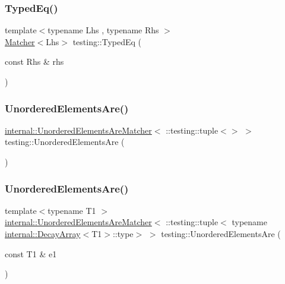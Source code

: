 \mbox{\label{namespacetesting_a57c9aba17aaa27d818e80a1eec81070f}} 
\subsubsection{\texorpdfstring{Typed\+Eq()}{TypedEq()}}
{\footnotesize\ttfamily template$<$typename Lhs , typename Rhs $>$ \\
\hyperlink{classtesting_1_1_matcher}{Matcher}$<$Lhs$>$ testing\+::\+Typed\+Eq (\begin{DoxyParamCaption}\item[{const Rhs \&}]{rhs }\end{DoxyParamCaption})\hspace{0.3cm}{\ttfamily [inline]}}

\mbox{\label{namespacetesting_a8622c12aadfa0e60f7d68683eeb21115}} 
\subsubsection{\texorpdfstring{Unordered\+Elements\+Are()}{UnorderedElementsAre()}\hspace{0.1cm}{\footnotesize\ttfamily [1/11]}}
{\footnotesize\ttfamily \hyperlink{classtesting_1_1internal_1_1_unordered_elements_are_matcher}{internal\+::\+Unordered\+Elements\+Are\+Matcher}$<$ \+::testing\+::tuple$<$$>$ $>$ testing\+::\+Unordered\+Elements\+Are (\begin{DoxyParamCaption}{ }\end{DoxyParamCaption})\hspace{0.3cm}{\ttfamily [inline]}}

\mbox{\label{namespacetesting_a0b81dd5584a3588cc2516b29ef166b7d}} 
\subsubsection{\texorpdfstring{Unordered\+Elements\+Are()}{UnorderedElementsAre()}\hspace{0.1cm}{\footnotesize\ttfamily [2/11]}}
{\footnotesize\ttfamily template$<$typename T1 $>$ \\
\hyperlink{classtesting_1_1internal_1_1_unordered_elements_are_matcher}{internal\+::\+Unordered\+Elements\+Are\+Matcher}$<$ \+::testing\+::tuple$<$ typename \hyperlink{structtesting_1_1internal_1_1_decay_array}{internal\+::\+Decay\+Array}$<$T1$>$\+::type$>$ $>$ testing\+::\+Unordered\+Elements\+Are (\begin{DoxyParamCaption}\item[{const T1 \&}]{e1 }\end{DoxyParamCaption})\hspace{0.3cm}{\ttfamily [inline]}}

